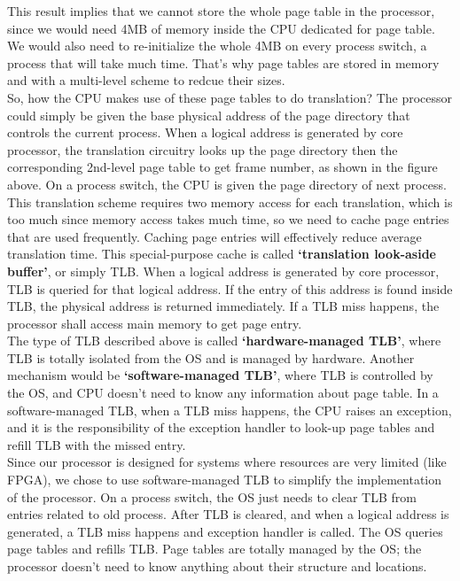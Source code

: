 \documentclass[]{scrartcl}
\begin{document}
This result implies that we cannot store the whole page table
in the processor, since we would need 4MB of memory inside
the CPU dedicated for page table. We would also need
to re-initialize the whole 4MB on every process switch, a process
that will take much time. That's why page tables are stored
in memory and with a multi-level scheme to redcue their sizes.\\

So, how the CPU makes use of these page tables to do translation?
The processor could simply be given the base physical address
of the page directory that controls the current process. When
a logical address is generated by core processor, the translation
circuitry looks up the page directory then the corresponding 2nd-level 
page table to get frame number, as shown in the figure above.
On a process switch, the CPU is given the page directory of
next process.\\

This translation scheme requires two memory access for each translation,
which is too much since memory access takes much time, so we need
to cache page entries that are used frequently. Caching page
entries will effectively reduce average translation time.
This special-purpose cache is called \textbf{`translation
look-aside buffer'}, or simply TLB. When a logical address is generated
by core processor, TLB is queried for that logical address. If
the entry of this address is found inside TLB, the physical
address is returned immediately. If a TLB miss happens, the processor
shall access main memory to get page entry.\\

The type of TLB described above is called \textbf{`hardware-managed TLB'},
where TLB is totally isolated from the OS and is managed by
hardware. Another mechanism would be \textbf{`software-managed TLB'},
where TLB is controlled by the OS, and CPU doesn't need
to know any information about page table. In a software-managed TLB,
when a TLB miss happens, the CPU raises an exception, and it is
the responsibility of the exception handler to look-up page
tables and refill TLB with the missed entry.\\

Since our processor is designed for systems where resources 
are very limited (like FPGA), we chose to use software-managed
TLB to simplify the implementation of the processor. On a process
switch, the OS just needs to clear TLB from entries related
to old process. After TLB is cleared, and when a logical address 
is generated, a TLB miss happens and exception handler is called.
The OS queries page tables and refills TLB. Page tables are
totally managed by the OS; the processor doesn't need
to know anything about their structure and locations. \\
\end{document}

